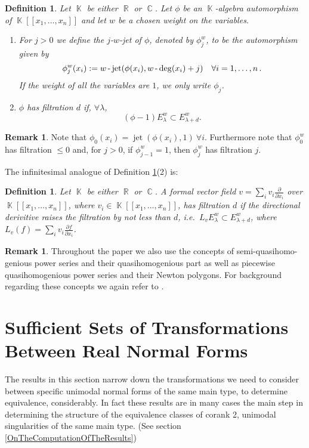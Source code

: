 \documentclass[noend]{amsproc}
\newtheorem{defn}[theorem]{Definition}
\theoremstyle{definition}
\newtheorem{remark}[theorem]{Remark}
\DeclareMathOperator{\R}{\mathbb{R}}
\DeclareMathOperator{\C}{\mathbb{C}}
\DeclareMathOperator{\K}{\mathbb{K}}
\DeclareMathOperator{\dash}{\textnormal{-}}
\DeclareMathOperator{\jet}{jet}
\begin{document}
\begin{defn}\label{phi}
Let $\K$ be either $\R$ or $\C$. Let $\phi$ be an $\K$-algebra automorphism of $\K[[x_1,\ldots,x_n]]$ and let $w$ be a chosen weight on the variables. 
\begin{enumerate}
\item For $j > 0$ we define the
\emph{$j$-$w$-jet} of $\phi$, denoted by $\phi_j^w$, to be the automorphism given by
\[
\phi_j^w(x_i) := w\dash\jet(\phi(x_i),w\dash\deg(x_i)+j) \quad \forall i = 1,\ldots,n \,.
\]
If the weight of all the variables are $1$, we only write $\phi_j$.\\
\item $\phi$ has filtration $d$ if,  $\forall\lambda$,
\[(\phi-1)E_\lambda^w\subset E_{\lambda+d}^w.\]
\end{enumerate}
\end{defn}

\begin{remark}
Note that $\phi_0(x_i)=\jet(\phi(x_i),1)\ \forall i$. Furthermore note that $\phi_0^w$ has filtration $\le 0$ and, for $j>0$, if $\phi_{j-1}^w=1$, then $\phi_j^w$ has filtration $j$. 
\end{remark}

The infinitesimal analogue of Definition \ref{phi}(2) is:

\begin{defn}
Let $\K$ be either $\R$ or $\C$. A formal vector field $v=\sum_i v_i\frac{\partial}{\partial x_i}$ over $\K[[x_1,\ldots,x_n]]$, where $v_i\in\K[[x_1,\ldots,x_n]]$, has filtration $d$ if the directional derivitive raises the filtration by not less than $d$, i.e.~$L_vE^w_\lambda\subset E^w_{\lambda+d}$, where $L_v(f)=\sum_i v_i\frac{\partial f}{\partial x_i}$.
\end{defn}

\begin{remark}
Throughout the paper we also use the concepts of semi-quasihomo-genious power series and their quasihomogenious part as well as piecewise quasihomogenious power series and their Newton polygons. For background regarding these concepts we again refer to \cite{A1975}.
\end{remark}

\section{Sufficient Sets of Transformations Between Real Normal Forms}
The results in this section narrow down the transformations we need to consider between specific unimodal normal forms of the same main type, to determine equivalence, considerably. In fact these results are in many cases the main step in determining the structure of the equivalence classes of corank 2, unimodal singularities of the same main type. (See section \ref{OnTheComputationOfTheResults})
\end{document}

